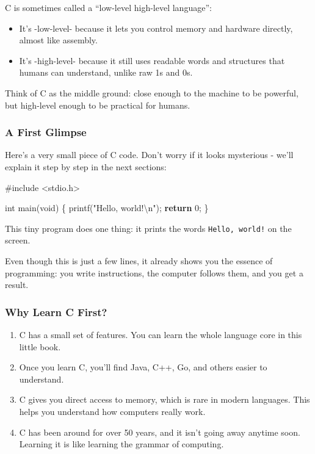 \documentclass[
  letterpaper,
  DIV=11,
  numbers=noendperiod]{scrreprt}
\newenvironment{Shaded}{\begin{snugshade}}{\end{snugshade}}
\newcommand{\ControlFlowTok}[1]{\textcolor[rgb]{0.00,0.23,0.31}{\textbf{#1}}}
\newcommand{\DataTypeTok}[1]{\textcolor[rgb]{0.68,0.00,0.00}{#1}}
\newcommand{\DecValTok}[1]{\textcolor[rgb]{0.68,0.00,0.00}{#1}}
\newcommand{\ImportTok}[1]{\textcolor[rgb]{0.00,0.46,0.62}{#1}}
\newcommand{\NormalTok}[1]{\textcolor[rgb]{0.00,0.23,0.31}{#1}}
\newcommand{\OperatorTok}[1]{\textcolor[rgb]{0.37,0.37,0.37}{#1}}
\newcommand{\PreprocessorTok}[1]{\textcolor[rgb]{0.68,0.00,0.00}{#1}}
\newcommand{\SpecialCharTok}[1]{\textcolor[rgb]{0.37,0.37,0.37}{#1}}
\newcommand{\StringTok}[1]{\textcolor[rgb]{0.13,0.47,0.30}{#1}}
\providecommand{\tightlist}{%
  \setlength{\itemsep}{0pt}\setlength{\parskip}{0pt}}
\begin{document}
C is sometimes called a ``low-level high-level language'':

\begin{itemize}
\tightlist
\item
  It's -low-level- because it lets you control memory and hardware
  directly, almost like assembly.
\item
  It's -high-level- because it still uses readable words and structures
  that humans can understand, unlike raw 1s and 0s.
\end{itemize}

Think of C as the middle ground: close enough to the machine to be
powerful, but high-level enough to be practical for humans.

\subsubsection{A First Glimpse}\label{a-first-glimpse}

Here's a very small piece of C code. Don't worry if it looks mysterious
- we'll explain it step by step in the next sections:

\begin{Shaded}
\begin{Highlighting}[]
\PreprocessorTok{\#include }\ImportTok{\textless{}stdio.h\textgreater{}}

\DataTypeTok{int}\NormalTok{ main}\OperatorTok{(}\DataTypeTok{void}\OperatorTok{)} \OperatorTok{\{}
\NormalTok{    printf}\OperatorTok{(}\StringTok{"Hello, world!}\SpecialCharTok{\textbackslash{}n}\StringTok{"}\OperatorTok{);}
    \ControlFlowTok{return} \DecValTok{0}\OperatorTok{;}
\OperatorTok{\}}
\end{Highlighting}
\end{Shaded}

This tiny program does one thing: it prints the words
\texttt{Hello,\ world!} on the screen.

Even though this is just a few lines, it already shows you the essence
of programming: you write instructions, the computer follows them, and
you get a result.

\subsubsection{Why Learn C First?}\label{why-learn-c-first}

\begin{enumerate}
\def\labelenumi{\arabic{enumi}.}
\tightlist
\item
  C has a small set of features. You can learn the whole language core
  in this little book.
\item
  Once you learn C, you'll find Java, C++, Go, and others easier to
  understand.
\item
  C gives you direct access to memory, which is rare in modern
  languages. This helps you understand how computers really work.
\item
  C has been around for over 50 years, and it isn't going away anytime
  soon. Learning it is like learning the grammar of computing.
\end{enumerate}
\end{document}
